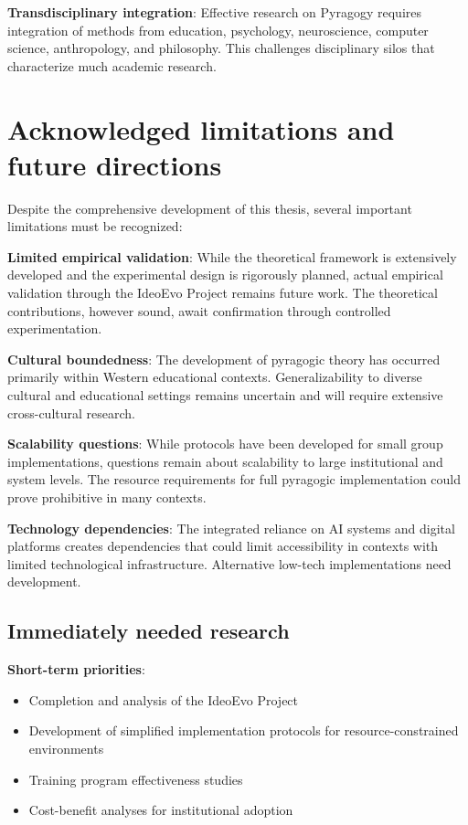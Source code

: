 \textbf{Transdisciplinary integration}:
Effective research on Pyragogy requires integration of methods from education, psychology, neuroscience, computer science, anthropology, and philosophy. This challenges disciplinary silos that characterize much academic research.

\section{Acknowledged limitations and future directions}

Despite the comprehensive development of this thesis, several important limitations must be recognized:

\textbf{Limited empirical validation}:
While the theoretical framework is extensively developed and the experimental design is rigorously planned, actual empirical validation through the IdeoEvo Project remains future work. The theoretical contributions, however sound, await confirmation through controlled experimentation.

\textbf{Cultural boundedness}:
The development of pyragogic theory has occurred primarily within Western educational contexts. Generalizability to diverse cultural and educational settings remains uncertain and will require extensive cross-cultural research.

\textbf{Scalability questions}:
While protocols have been developed for small group implementations, questions remain about scalability to large institutional and system levels. The resource requirements for full pyragogic implementation could prove prohibitive in many contexts.

\textbf{Technology dependencies}:
The integrated reliance on AI systems and digital platforms creates dependencies that could limit accessibility in contexts with limited technological infrastructure. Alternative low-tech implementations need development.

\newpage

\subsection{Immediately needed research}

\textbf{Short-term priorities}:
\begin{itemize}
	\item Completion and analysis of the IdeoEvo Project
	\item Development of simplified implementation protocols for resource-constrained environments  
	\item Training program effectiveness studies
	\item Cost-benefit analyses for institutional adoption
\end{itemize}

